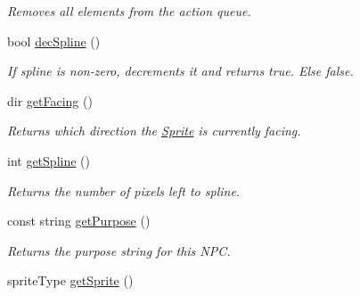 \begin{DoxyCompactItemize}
\begin{DoxyCompactList}\small\item\em Removes all elements from the action queue. \end{DoxyCompactList}\item 
bool \hyperlink{class_sprite_af880e3cfcd03b6de68171eef82dc6a69}{dec\+Spline} ()\hypertarget{class_sprite_af880e3cfcd03b6de68171eef82dc6a69}{}\label{class_sprite_af880e3cfcd03b6de68171eef82dc6a69}

\begin{DoxyCompactList}\small\item\em If spline is non-\/zero, decrements it and returns true. Else false. \end{DoxyCompactList}\item 
dir \hyperlink{class_sprite_a6bf9e87449da385e99c02586eadf5de6}{get\+Facing} ()\hypertarget{class_sprite_a6bf9e87449da385e99c02586eadf5de6}{}\label{class_sprite_a6bf9e87449da385e99c02586eadf5de6}

\begin{DoxyCompactList}\small\item\em Returns which direction the \hyperlink{class_sprite}{Sprite} is currently facing. \end{DoxyCompactList}\item 
int \hyperlink{class_sprite_aad5e5beb45ec5eae6fe8d096d5ebef68}{get\+Spline} ()\hypertarget{class_sprite_aad5e5beb45ec5eae6fe8d096d5ebef68}{}\label{class_sprite_aad5e5beb45ec5eae6fe8d096d5ebef68}

\begin{DoxyCompactList}\small\item\em Returns the number of pixels left to spline. \end{DoxyCompactList}\item 
const string \hyperlink{class_sprite_ab130d27f349a15e736e2f60c9a20ca0d}{get\+Purpose} ()\hypertarget{class_sprite_ab130d27f349a15e736e2f60c9a20ca0d}{}\label{class_sprite_ab130d27f349a15e736e2f60c9a20ca0d}

\begin{DoxyCompactList}\small\item\em Returns the purpose string for this N\+PC. \end{DoxyCompactList}\item 
sprite\+Type \hyperlink{class_sprite_a01742e39c9f18622a094a187d6858912}{get\+Sprite} ()\hypertarget{class_sprite_a01742e39c9f18622a094a187d6858912}{}\label{class_sprite_a01742e39c9f18622a094a187d6858912}


\end{DoxyCompactItemize}
